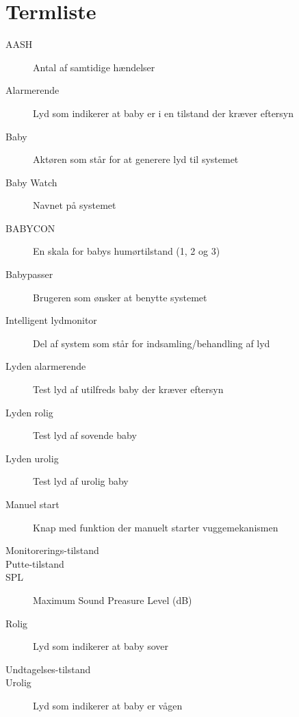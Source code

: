 \chapter{Termliste}


\begin{description}
\item[AASH] Antal af samtidige hændelser
\item[Alarmerende] Lyd som indikerer at baby er i en tilstand der kræver eftersyn
\item[Baby] Aktøren som står for at generere lyd til systemet
\item[Baby Watch] Navnet på systemet
\item[BABYCON] En skala for babys humørtilstand (1, 2 og 3)
\item[Babypasser] Brugeren som ønsker at benytte systemet
\item[Intelligent lydmonitor] Del af system som står for indsamling/behandling af lyd
\item[Lyden alarmerende] Test lyd af utilfreds baby der kræver eftersyn
\item[Lyden rolig] Test lyd af sovende baby
\item[Lyden urolig] Test lyd af urolig baby
\item[Manuel start] Knap med funktion der manuelt starter vuggemekanismen
\item[Monitorerings-tilstand] 
\item[Putte-tilstand]
\item[SPL] Maximum Sound Preasure Level (dB)
\item[Rolig] Lyd som indikerer at baby sover
\item[Undtagelses-tilstand]
\item[Urolig] Lyd som indikerer at baby er vågen




\end{description}